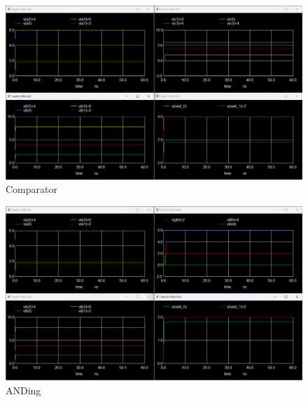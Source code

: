 \documentclass[a4paper, titlepage]{article}
\begin{document}
\begin{figure}[htp!]
    \centering
    \hypertarget{NGC}{\includegraphics[scale = 0.3]{Comparator_output.png}}
    \caption{Comparator}
    \label{fig:fig15}
\end{figure}
\begin{figure}[htp!]
    \centering
    \hypertarget{NGA}{\includegraphics[scale = 0.3]{ANDer_output.png}}
    \caption{ANDing}
    \label{fig:fig16}
\end{figure}
\end{document}
